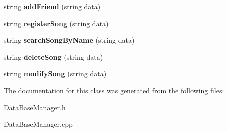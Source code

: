 \begin{DoxyCompactItemize}
\item 
string {\bfseries add\+Friend} (string data)\hypertarget{classDataBaseManager_a7048262617f2075b4b49d56957a65cb3}{}\label{classDataBaseManager_a7048262617f2075b4b49d56957a65cb3}

\item 
string {\bfseries register\+Song} (string data)\hypertarget{classDataBaseManager_ae85ca7488897141b40e42ec15cd68873}{}\label{classDataBaseManager_ae85ca7488897141b40e42ec15cd68873}

\item 
string {\bfseries search\+Song\+By\+Name} (string data)\hypertarget{classDataBaseManager_ac9771093f0620b1e3b1de932c3a929ca}{}\label{classDataBaseManager_ac9771093f0620b1e3b1de932c3a929ca}

\item 
string {\bfseries delete\+Song} (string data)\hypertarget{classDataBaseManager_ab156654a65cb479bba37b079edb4c22c}{}\label{classDataBaseManager_ab156654a65cb479bba37b079edb4c22c}

\item 
string {\bfseries modify\+Song} (string data)\hypertarget{classDataBaseManager_aecba35859939b1f22e889f2cec791a5e}{}\label{classDataBaseManager_aecba35859939b1f22e889f2cec791a5e}

\end{DoxyCompactItemize}


The documentation for this class was generated from the following files\+:\begin{DoxyCompactItemize}
\item 
Data\+Base\+Manager.\+h\item 
Data\+Base\+Manager.\+cpp\end{DoxyCompactItemize}
